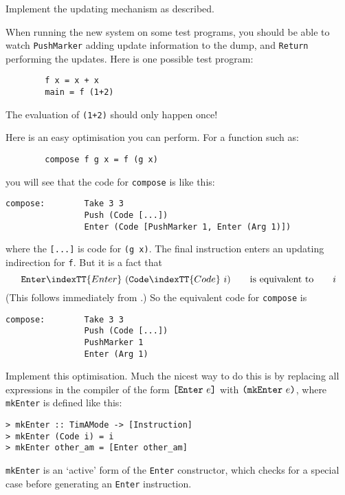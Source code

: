 \begin{exercise}
Implement the updating mechanism as described.

When running the new system on some test programs, you should
be able to watch \mbox{\tt PushMarker} adding update information to the dump,
and \mbox{\tt Return} performing the updates.  Here is one possible test
program:
\begin{verbatim}
        f x = x + x
        main = f (1+2)
\end{verbatim}
The evaluation of \mbox{\tt (1+2)} should only happen once!
\end{exercise}

\begin{exercise}
Here is an easy optimisation you can perform.  For a function such as:
\begin{verbatim}
        compose f g x = f (g x)
\end{verbatim}
you will see that the code for \mbox{\tt compose} is like this:
\begin{verbatim}
compose:        Take 3 3
                Push (Code [...])
                Enter (Code [PushMarker 1, Enter (Arg 1)])
\end{verbatim}
where the \mbox{\tt [...]} is code for \mbox{\tt (g\ x)}.  The final instruction enters
an updating indirection for \mbox{\tt f}.
But it is a fact that
\[
\mbox{\tt Enter}\indexTT{Enter}~(\mbox{\tt Code}\indexTT{Code}~i) \qquad \mbox{is equivalent to} \qquad i
\]
(This follows immediately from .)
So the equivalent code for \mbox{\tt compose} is
\begin{verbatim}
compose:        Take 3 3
                Push (Code [...])
                PushMarker 1
                Enter (Arg 1)
\end{verbatim}
Implement this optimisation.  Much the nicest way to do this is by
replacing all expressions in the compiler of the form $\mbox{\tt [Enter}~e\mbox{\tt ]}$
with $\mbox{\tt (mkEnter}~e\mbox{\tt )}$, where \mbox{\tt mkEnter} is
defined like this:
\begin{verbatim}
> mkEnter :: TimAMode -> [Instruction]
> mkEnter (Code i) = i
> mkEnter other_am = [Enter other_am]
\end{verbatim}
%
%
%
\mbox{\tt mkEnter} is an `active' form of the \mbox{\tt Enter} constructor, which
checks for a special case before generating an \mbox{\tt Enter} instruction.
\end{exercise}

